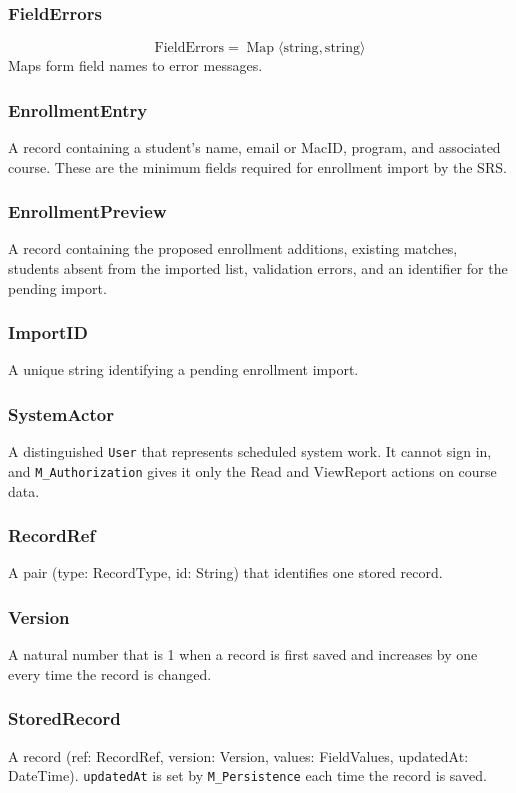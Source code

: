 \documentclass[12pt, titlepage]{article}
\begin{document}
\subsubsection{FieldErrors}
\[
\text{FieldErrors} = \operatorname{Map}\langle\text{string},\text{string}\rangle
\]
Maps form field names to error messages.

\subsubsection{EnrollmentEntry}
A record containing a student's name, email or MacID, program, and associated course. These are the minimum fields required for enrollment import by the SRS.

\subsubsection{EnrollmentPreview}
A record containing the proposed enrollment additions, existing matches, students absent from the imported list, validation errors, and an identifier for the pending import.

\subsubsection{ImportID}
A unique string identifying a pending enrollment import.

\subsubsection{SystemActor}
A distinguished \texttt{User} that represents scheduled system work.
It cannot sign in, and \texttt{M\_Authorization} gives it only the Read and ViewReport actions on course data.

\subsubsection{RecordRef}
A pair (type: RecordType, id: String) that identifies one stored record.

\subsubsection{Version}
A natural number that is 1 when a record is first saved and increases by one every time the record is changed.

\subsubsection{StoredRecord}
A record (ref: RecordRef, version: Version, values: FieldValues, updatedAt: DateTime).
\texttt{updatedAt} is set by \texttt{M\_Persistence} each time the record is saved.
\end{document}
